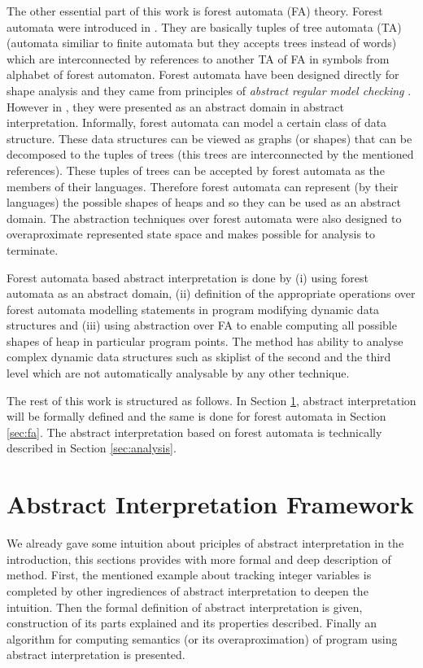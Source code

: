 \documentclass[a4paper, 12pt]{article}
\begin{document}
The other essential part of this work is forest automata (FA) theory.
Forest automata were introduced in \cite{cav11}.
They are basically tuples of tree automata (TA) (automata similiar to finite automata
but they accepts trees instead of words) which are interconnected
by references to another TA of FA in symbols from alphabet of forest automaton.
Forest automata have been designed directly for shape analysis and
they came from principles of \emph{abstract regular model checking} \cite{artmc}.
However in \cite{atva13}, they were presented as an abstract domain in abstract interpretation.
Informally, forest automata can model a certain class of data structure.
These data structures can be viewed as graphs (or shapes) that can be decomposed to the tuples
of trees (this trees are interconnected by the mentioned references).
These tuples of trees can be accepted by forest automata as the members of their languages.
Therefore forest automata can represent (by their languages) the possible shapes of heaps
and so they can be used as an abstract domain.
The abstraction techniques over forest automata were also designed
to overaproximate represented state space and makes possible for analysis to terminate.

Forest automata based abstract interpretation is done by (i) using
forest automata as an abstract domain, (ii) definition of the appropriate
operations over forest automata modelling statements in program
modifying dynamic data structures and (iii) using abstraction over FA
to enable computing all possible shapes of heap in particular
program points.
The method has ability to analyse complex dynamic data structures
such as skiplist of the second and the third level which are not
automatically analysable by any other technique.

The rest of this work is structured as follows.
In Section \ref{sec:aif}, abstract interpretation will
be formally defined and the same is done for forest automata
in Section \ref{sec:fa}.
The abstract interpretation based on forest automata is technically
described in Section \ref{sec:analysis}.

\section{Abstract Interpretation Framework}
\label{sec:aif}
We already gave some intuition about priciples of abstract interpretation in the introduction,
this sections provides with more formal and deep description of method.
First, the mentioned example about tracking integer variables is completed by
other ingrediences of abstract interpretation to deepen the intuition.
Then the formal definition of abstract interpretation is given, construction of its parts
explained and its properties described.
Finally an algorithm for computing semantics (or its overaproximation) of program
using abstract interpretation is presented.
\end{document}
